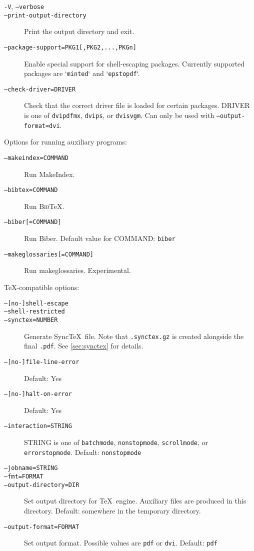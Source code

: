 \documentclass[a4paper]{report}
\providecommand\BibTeX{\textsc{Bib}\TeX}
\newcommand\metavar[1]{\textnormal{\textsf{#1}}}
\begin{document}
\begin{description}
\item[\texttt{-V}, \texttt{--verbose}]
\item[\texttt{--print-output-directory}]
  Print the output directory and exit.
\item[\texttt{--package-support=PKG1[,PKG2,...,PKGn]}]
  Enable special support for shell-escaping packages.
  Currently supported packages are `\texttt{minted}` and `\texttt{epstopdf}`.
\item[\texttt{--check-driver=DRIVER}]
  Check that the correct driver file is loaded for certain packages.
  \metavar{DRIVER} is one of \texttt{dvipdfmx}, \texttt{dvips}, or \texttt{dvisvgm}.
  Can only be used with \texttt{--output-format=dvi}.
\end{description}

Options for running auxiliary programs:
\begin{description}
\item[\texttt{--makeindex=\metavar{COMMAND}}]
  Run MakeIndex.
\item[\texttt{--bibtex=\metavar{COMMAND}}]
  Run \BibTeX.
\item[\texttt{--biber[=\metavar{COMMAND}]}]
  Run Biber. Default value for \metavar{COMMAND}: \texttt{biber}
\item[\texttt{--makeglossaries[=\metavar{COMMAND}]}]
  Run makeglossaries. Experimental.
\end{description}

\TeX-compatible options:
\begin{description}
\item[\texttt{--[no-]shell-escape}]
\item[\texttt{--shell-restricted}]
\item[\texttt{--synctex=\metavar{NUMBER}}]
  Generate Sync\TeX\ file.
  Note that \texttt{.synctex.gz} is created alongside the final \texttt{.pdf}.
  See \autoref{sec:synctex} for details.
\item[\texttt{--[no-]file-line-error}]
  Default: Yes
\item[\texttt{--[no-]halt-on-error}]
  Default: Yes
\item[\texttt{--interaction=\metavar{STRING}}]
  \metavar{STRING} is one of \texttt{batchmode}, \texttt{nonstopmode}, \texttt{scrollmode}, or \texttt{errorstopmode}.
  Default: \texttt{nonstopmode}
\item[\texttt{--jobname=\metavar{STRING}}]
\item[\texttt{--fmt=\metavar{FORMAT}}]
\item[\texttt{--output-directory=\metavar{DIR}}]
  Set output directory for \TeX\ engine.
  Auxiliary files are produced in this directory.
  Default: somewhere in the temporary directory.
\item[\texttt{--output-format=\metavar{FORMAT}}]
  Set output format.
  Possible values are \texttt{pdf} or \texttt{dvi}.
  Default: \texttt{pdf}
\end{description}
\end{document}
